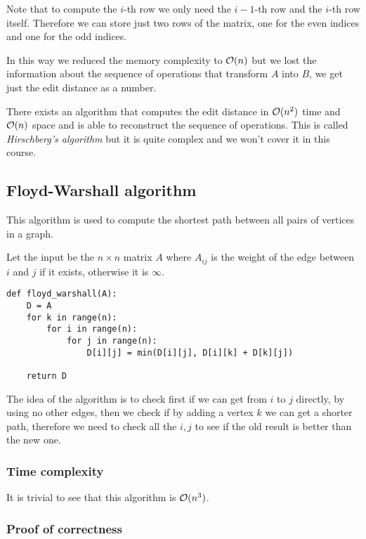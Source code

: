 \documentclass[12pt]{extarticle}
\begin{document}
Note that to compute the $i$-th row we only need the $i-1$-th row and the $i$-th row itself.
Therefore we can store just two rows of the matrix, one for the even indices and one for the odd indices.

In this way we reduced the memory complexity to $\mathcal{O}(n)$ but we lost the information about the sequence of operations that transform $A$ into $B$, we get just the edit distance as a number.

\begin{remark}
    There exists an algorithm that computes the edit distance in $\mathcal{O}(n^2)$ time and $\mathcal{O}(n)$ space and is able to reconstruct the sequence of operations. This is called \emph{Hirschberg's algorithm} but it is quite complex and we won't cover it in this course.
\end{remark}

\subsection{Floyd-Warshall algorithm}

This algorithm is used to compute the shortest path between all pairs of vertices in a graph.

Let the input be the $n \times n$ matrix $A$ where $A_{ij}$ is the weight of the edge between $i$ and $j$ if it exists, otherwise it is $\infty$.

\begin{verbatim}
def floyd_warshall(A):
    D = A
    for k in range(n):
        for i in range(n):
            for j in range(n):
                D[i][j] = min(D[i][j], D[i][k] + D[k][j])

    return D
\end{verbatim}

The idea of the algorithm is to check first if we can get from $i$ to $j$ directly, by using no other edges, then we check if by adding a vertex $k$ we can get a shorter path, therefore we need to check all the $i, j$ to see if the old result is better than the new one.

\subsubsection{Time complexity}

It is trivial to see that this algorithm is $\mathcal{O}(n^3)$.

\subsubsection{Proof of correctness}
\end{document}
